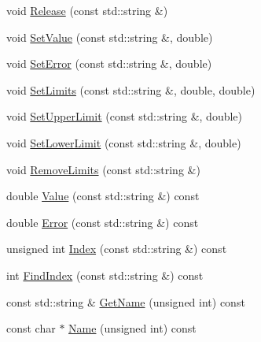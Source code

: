 \begin{DoxyCompactItemize}
\item 
void \mbox{\hyperlink{classROOT_1_1Minuit2_1_1MnUserTransformation_ac9272ca2d514e879f59b0bb7dcbf9906}{Release}} (const std\+::string \&)
\item 
void \mbox{\hyperlink{classROOT_1_1Minuit2_1_1MnUserTransformation_a30717c0bcc5206cc957e505b9cfd64fd}{Set\+Value}} (const std\+::string \&, double)
\item 
void \mbox{\hyperlink{classROOT_1_1Minuit2_1_1MnUserTransformation_ae63d2c7ee55629e691973082b1099e30}{Set\+Error}} (const std\+::string \&, double)
\item 
void \mbox{\hyperlink{classROOT_1_1Minuit2_1_1MnUserTransformation_ae00c15c6e7def8b4c1c1c9d44b52e647}{Set\+Limits}} (const std\+::string \&, double, double)
\item 
void \mbox{\hyperlink{classROOT_1_1Minuit2_1_1MnUserTransformation_aabe0a301a7d6f7fc322afcc4544e1129}{Set\+Upper\+Limit}} (const std\+::string \&, double)
\item 
void \mbox{\hyperlink{classROOT_1_1Minuit2_1_1MnUserTransformation_aebc0f6d54f3ae5d58b86435529c16796}{Set\+Lower\+Limit}} (const std\+::string \&, double)
\item 
void \mbox{\hyperlink{classROOT_1_1Minuit2_1_1MnUserTransformation_ae5e9a3037483cfc354b739ef44cd1867}{Remove\+Limits}} (const std\+::string \&)
\item 
double \mbox{\hyperlink{classROOT_1_1Minuit2_1_1MnUserTransformation_a89cf5aca1d345e0d2d069ad6a54ff94d}{Value}} (const std\+::string \&) const
\item 
double \mbox{\hyperlink{classROOT_1_1Minuit2_1_1MnUserTransformation_a176d46b9b3b58479a92145e7f9293143}{Error}} (const std\+::string \&) const
\item 
unsigned int \mbox{\hyperlink{classROOT_1_1Minuit2_1_1MnUserTransformation_aa4173a2f341790d8e61635eeed2555bb}{Index}} (const std\+::string \&) const
\item 
int \mbox{\hyperlink{classROOT_1_1Minuit2_1_1MnUserTransformation_a9bccf4b65c979cb6b959f8fb787f676a}{Find\+Index}} (const std\+::string \&) const
\item 
const std\+::string \& \mbox{\hyperlink{classROOT_1_1Minuit2_1_1MnUserTransformation_aa2b1548a49a6289914e4cde2fd40d780}{Get\+Name}} (unsigned int) const
\item 
const char $\ast$ \mbox{\hyperlink{classROOT_1_1Minuit2_1_1MnUserTransformation_aabd7adf5448aa905598b93a6d633e0ac}{Name}} (unsigned int) const
\end{DoxyCompactItemize}


